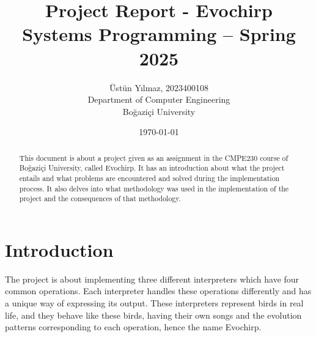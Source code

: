 \documentclass[a4paper,12pt]{article}
\title{Project Report - Evochirp\emoji{bird}   \\ \large Systems Programming – Spring 2025}
\author{Üstün Yılmaz, 2023400108 
\\ Department of Computer Engineering \\ Boğaziçi University
}
\date{\today}
\begin{document}
\maketitle

\begin{abstract}
This document is about a project given as an assignment in the CMPE230 course of Boğaziçi University, called Evochirp. It has an introduction about what the project entails and what problems are encountered and solved during the implementation process. It also delves into what methodology was used in the implementation of the project and the consequences of that methodology.
\end{abstract}

\section{Introduction}
The project is about implementing three different interpreters which have four common operations. Each interpreter handles these operations differently and has a unique way of expressing its output. These interpreters represent birds in real life, and they behave like these birds, having their own songs and the evolution patterns corresponding to each operation, hence the name Evochirp.
\end{document}
